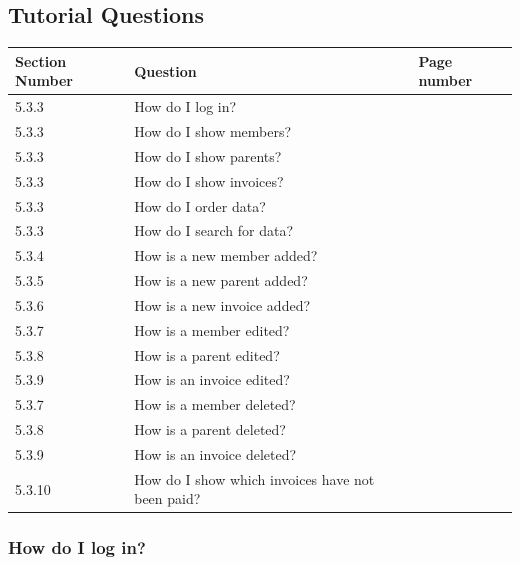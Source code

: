 \subsection{Tutorial Questions}

\begin{center}
	\begin{longtable}{|p{2cm}|p{4cm}|p{4cm}|}
		\hline
		\textbf{Section Number}  &  \textbf{Question}  &  \textbf{Page number}  \\ \hline
		5.3.3 & How do I log in? & \pageref{login_screen} \\ \hline
		5.3.3 & How do I show members? & \pageref{show_member} \\ \hline
		5.3.3 & How do I show parents? & \pageref{show_parent} \\ \hline
		5.3.3 & How do I show invoices? & \pageref{show_invoice} \\ \hline
		5.3.3 & How do I order data? & \pageref{show_member} \\ \hline
		5.3.3 & How do I search for data? & \pageref{show_member} \\ \hline
		5.3.4 & How is a new member added? & \pageref{add_member} \\ \hline
		5.3.5 & How is a new parent added? & \pageref{add_member} \\ \hline
		5.3.6 & How is a new invoice added? & \pageref{add_member} \\ \hline
		5.3.7 & How is a member edited? & \pageref{edit_member} \\ \hline
		5.3.8 & How is a parent edited? & \pageref{edit_member} \\ \hline
		5.3.9 & How is an invoice edited?  & \pageref{edit_member} \\ \hline
		5.3.7 & How is a member deleted? & \pageref{delete_member} \\ \hline
		5.3.8 & How is a parent deleted? & \pageref{delete_member} \\ \hline
		5.3.9 & How is an invoice deleted?  & \pageref{delete_member} \\ \hline
		5.3.10 & How do I show which invoices have not been paid? & \pageref{report_invoice} \\ \hline
	\end{longtable}
\end{center}

\subsubsection{How do I log in?}
\label{login_screen}

